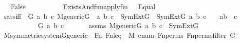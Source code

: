 \begin{isabellebody}
\ \ \ False\isanewline
%
\isadelimproof
%
\endisadelimproof
%
\isatagproof
{}\isamarkupfalse%
\ {\isacharminus}{\kern0pt}\ \isanewline
\isanewline
\ \ \isamarkupfalse%
\ {\isasymphi}\ \ {\isachardoublequoteopen}{\isasymphi}\ {\isasymequiv}\ Exists{\isacharparenleft}{\kern0pt}And{\isacharparenleft}{\kern0pt}fun{\isacharunderscore}{\kern0pt}apply{\isacharunderscore}{\kern0pt}fm{\isacharparenleft}{\kern0pt}{}{\isacharcomma}{\kern0pt}\ {}{\isacharcomma}{\kern0pt}\ {}{\isacharparenright}{\kern0pt}{\isacharcomma}{\kern0pt}\ Equal{\isacharparenleft}{\kern0pt}{}{\isacharcomma}{\kern0pt}\ {}{\isacharparenright}{\kern0pt}{\isacharparenright}{\kern0pt}{\isacharparenright}{\kern0pt}{\isachardoublequoteclose}\ \isanewline
\isanewline
\ \ \isamarkupfalse%
\ sats{\isacharunderscore}{\kern0pt}{\isasymphi}{\isacharunderscore}{\kern0pt}iff\ {\isacharcolon}{\kern0pt}\ {\isachardoublequoteopen}{\isasymAnd}G\ a\ b\ c{\isachardot}{\kern0pt}\ M{\isacharunderscore}{\kern0pt}generic{\isacharparenleft}{\kern0pt}G{\isacharparenright}{\kern0pt}\ {\isasymLongrightarrow}\ {\isacharbraceleft}{\kern0pt}a{\isacharcomma}{\kern0pt}\ b{\isacharcomma}{\kern0pt}\ c{\isacharbraceright}{\kern0pt}\ {\isasymsubseteq}\ SymExt{\isacharparenleft}{\kern0pt}G{\isacharparenright}{\kern0pt}\ {\isasymLongrightarrow}\ {\isacharparenleft}{\kern0pt}SymExt{\isacharparenleft}{\kern0pt}G{\isacharparenright}{\kern0pt}{\isacharcomma}{\kern0pt}\ {\isacharbrackleft}{\kern0pt}a{\isacharcomma}{\kern0pt}\ b{\isacharcomma}{\kern0pt}\ c{\isacharbrackright}{\kern0pt}\ {\isasymTurnstile}\ {\isasymphi}{\isacharparenright}{\kern0pt}\ {\isasymlongleftrightarrow}\ a{\isacharbackquote}{\kern0pt}b\ {\isacharequal}{\kern0pt}\ c{\isachardoublequoteclose}\isanewline
\ \ \isamarkupfalse%
\ {\isacharminus}{\kern0pt}\ \isanewline
\ \ \ \ \isamarkupfalse%
\ G\ a\ b\ c\ \isanewline
\ \ \ \ \isamarkupfalse%
\ assms{}{\isacharcolon}{\kern0pt}\ {\isachardoublequoteopen}M{\isacharunderscore}{\kern0pt}generic{\isacharparenleft}{\kern0pt}G{\isacharparenright}{\kern0pt}{\isachardoublequoteclose}\ {\isachardoublequoteopen}{\isacharbraceleft}{\kern0pt}a{\isacharcomma}{\kern0pt}\ b{\isacharcomma}{\kern0pt}\ c{\isacharbraceright}{\kern0pt}\ {\isasymsubseteq}\ SymExt{\isacharparenleft}{\kern0pt}G{\isacharparenright}{\kern0pt}{\isachardoublequoteclose}\ \isanewline
\ \ \isanewline
\ \ \ \ \isamarkupfalse%
\ M{\isacharunderscore}{\kern0pt}symmetric{\isacharunderscore}{\kern0pt}system{\isacharunderscore}{\kern0pt}G{\isacharunderscore}{\kern0pt}generic\ \ {\isachardoublequoteopen}Fn{\isachardoublequoteclose}\ {\isachardoublequoteopen}Fn{\isacharunderscore}{\kern0pt}leq{\isachardoublequoteclose}\ {\isachardoublequoteopen}{}{\isachardoublequoteclose}\ {\isachardoublequoteopen}M{\isachardoublequoteclose}\ {\isachardoublequoteopen}enum{\isachardoublequoteclose}\ {\isachardoublequoteopen}Fn{\isacharunderscore}{\kern0pt}perms{\isachardoublequoteclose}\ {\isachardoublequoteopen}Fn{\isacharunderscore}{\kern0pt}perms{\isacharunderscore}{\kern0pt}filter{\isachardoublequoteclose}\ G\ \isanewline

\end{isabellebody}
